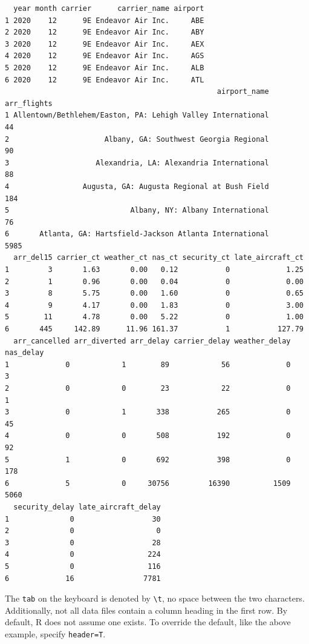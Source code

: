 \documentclass[
  letterpaper,
  DIV=11,
  numbers=noendperiod]{scrreprt}
\begin{document}
\begin{verbatim}
  year month carrier      carrier_name airport
1 2020    12      9E Endeavor Air Inc.     ABE
2 2020    12      9E Endeavor Air Inc.     ABY
3 2020    12      9E Endeavor Air Inc.     AEX
4 2020    12      9E Endeavor Air Inc.     AGS
5 2020    12      9E Endeavor Air Inc.     ALB
6 2020    12      9E Endeavor Air Inc.     ATL
                                                 airport_name arr_flights
1 Allentown/Bethlehem/Easton, PA: Lehigh Valley International          44
2                      Albany, GA: Southwest Georgia Regional          90
3                    Alexandria, LA: Alexandria International          88
4                 Augusta, GA: Augusta Regional at Bush Field         184
5                            Albany, NY: Albany International          76
6       Atlanta, GA: Hartsfield-Jackson Atlanta International        5985
  arr_del15 carrier_ct weather_ct nas_ct security_ct late_aircraft_ct
1         3       1.63       0.00   0.12           0             1.25
2         1       0.96       0.00   0.04           0             0.00
3         8       5.75       0.00   1.60           0             0.65
4         9       4.17       0.00   1.83           0             3.00
5        11       4.78       0.00   5.22           0             1.00
6       445     142.89      11.96 161.37           1           127.79
  arr_cancelled arr_diverted arr_delay carrier_delay weather_delay nas_delay
1             0            1        89            56             0         3
2             0            0        23            22             0         1
3             0            1       338           265             0        45
4             0            0       508           192             0        92
5             1            0       692           398             0       178
6             5            0     30756         16390          1509      5060
  security_delay late_aircraft_delay
1              0                  30
2              0                   0
3              0                  28
4              0                 224
5              0                 116
6             16                7781
\end{verbatim}

The \texttt{tab} on the keyboard is denoted by
\texttt{\textbackslash{}t}, no space between the two characters.
Additionally, not all data files contain a column heading in the first
row. By default, R does not assume one exists. To override the default,
like the above example, specify \texttt{header=T}.
\end{document}
